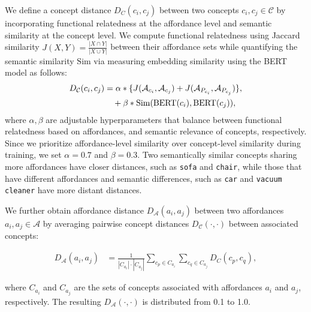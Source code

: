 We define a concept distance $D_{C}(c_i, c_j)$ between two concepts $c_i, c_j \in \mathcal{C}$ by incorporating functional relatedness at the affordance level and semantic similarity at the concept level. We compute functional relatedness using Jaccard similarity $J(X, Y) = \frac{|X \cap Y|}{|X \cup Y|}$ between their affordance sets while quantifying the semantic similarity $\text{Sim}$ via measuring embedding similarity using the BERT~\citep{devlin2019bertpretrainingdeepbidirectional} model as follows:
\begin{align}
    \label{eq:dist_concept}
     D_{\mathcal{C}} (c_i, c_j) &= \alpha*\{J(\mathcal{A}_{c_i}, \mathcal{A}_{c_j}) + J(\mathcal{A}_{P_{c_i}}, \mathcal{A}_{P_{c_j}})\}, \notag \\
                        &\quad+ \beta*\text{Sim}(\text{BERT}(c_i), \text{BERT}(c_j)),  
\end{align}
where $\alpha, \beta$ are adjustable hyperparameters that balance between functional relatedness based on affordances, and semantic relevance of concepts, respectively.
Since we prioritize affordance-level similarity over concept-level similarity during training, we set $\alpha=0.7$ and $\beta=0.3$.
Two semantically similar concepts sharing more affordances have closer distances, such as \texttt{sofa} and \texttt{chair}, while those that have different affordances and semantic differences, such as \texttt{car} and \texttt{vacuum cleaner} have more distant distances.


We further obtain affordance distance $D_{\mathcal{A}} (a_i, a_j)$ between two affordances $a_i, a_j \in \mathcal{A}$ by averaging pairwise concept distances $D_{\mathcal{C}}(\cdot, \cdot)$ between associated concepts:
\begin{sizeddisplay}{\normalsize}
\begin{align}
     \label{eq:dist_affordance}
     D_{\mathcal{A}} (a_i, a_j) &= \frac{1}{|C_{a_i}| \cdot |C_{a_j}|} \sum_{c_p \in C_{a_i}} \sum_{c_q \in C_{a_j}} D_{C}(c_p, c_q),
\end{align}
\end{sizeddisplay}
where $C_{a_i}$ and $C_{a_j}$ are the sets of concepts associated with affordances $a_i$ and $a_j$, respectively. The resulting $D_{\mathcal{A}}(\cdot, \cdot)$ is distributed from 0.1 to 1.0.

